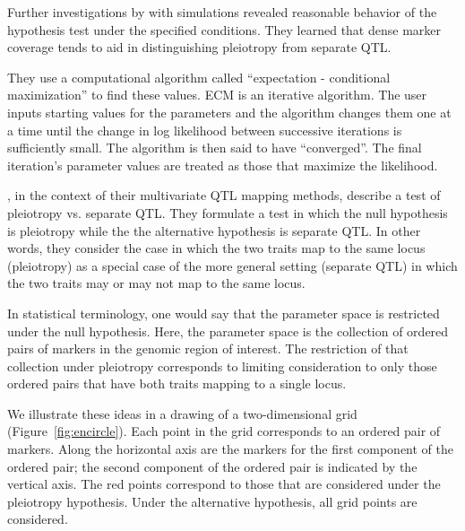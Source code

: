 \documentclass[oneside]{book}\usepackage[]{graphicx}\usepackage[]{color}
\begin{document}
Further investigations by \citet{jiang1995multiple} with simulations revealed
reasonable behavior of the hypothesis test under the specified conditions. 
They learned that dense marker coverage tends to aid in distinguishing pleiotropy
from separate QTL. 










They use a computational algorithm called ``expectation - conditional maximization'' to find these values. 
ECM is an iterative algorithm. 
The user inputs starting values for the parameters and the algorithm changes them one at a
time until the change in log likelihood between successive iterations is sufficiently small.
The algorithm is then said to have ``converged''. 
The final iteration’s parameter values are treated as those that maximize the likelihood.


\citet{jiang1995multiple}, in the context of their multivariate QTL mapping methods, 
describe a test of pleiotropy vs. separate QTL. 
They formulate a test in which the null hypothesis
is pleiotropy while the the alternative hypothesis is separate QTL.
In other words, they consider the case in which the two traits map to the same locus
(pleiotropy) as a special case of the more general setting (separate QTL)
in which the two traits may or may not map to the same locus.

In statistical terminology, one would say that the parameter space is restricted under the null hypothesis. Here, the parameter space is the collection of ordered pairs of markers in the genomic region of interest. The restriction of that collection under pleiotropy corresponds to limiting consideration to only those ordered pairs that have both traits mapping to a single locus. 

We illustrate these ideas in a drawing of a two-dimensional grid (Figure~\ref{fig:encircle}). Each point in the grid corresponds to an ordered pair of markers. Along the horizontal axis are the markers for the first component of the ordered pair; the second component of the ordered pair is indicated by the vertical axis. The red points correspond to those that are considered under the pleiotropy hypothesis. Under the alternative hypothesis, all grid points are considered. 
\end{document}
